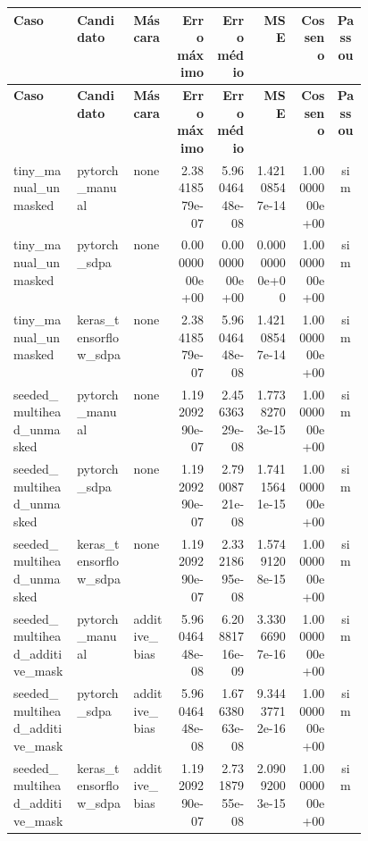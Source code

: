 \begin{landscape}
\scriptsize
\begin{longtable}{@{}p{0.18\linewidth}p{0.16\linewidth}p{0.12\linewidth}rrrrc@{}}
\toprule
\textbf{Caso} & \textbf{Candidato} & \textbf{Máscara} & \textbf{Erro máximo} & \textbf{Erro médio} & \textbf{MSE} & \textbf{Cosseno} & \textbf{Passou} \\
\midrule
\endfirsthead
\toprule
\textbf{Caso} & \textbf{Candidato} & \textbf{Máscara} & \textbf{Erro máximo} & \textbf{Erro médio} & \textbf{MSE} & \textbf{Cosseno} & \textbf{Passou} \\
\midrule
\endhead
tiny\_\allowbreak{}manual\_\allowbreak{}unmasked & pytorch\_\allowbreak{}manual & none & 2.38418579e-07 & 5.96046448e-08 & 1.42108547e-14 & 1.00000000e+00 & sim \\
tiny\_\allowbreak{}manual\_\allowbreak{}unmasked & pytorch\_\allowbreak{}sdpa & none & 0.00000000e+00 & 0.00000000e+00 & 0.00000000e+00 & 1.00000000e+00 & sim \\
tiny\_\allowbreak{}manual\_\allowbreak{}unmasked & keras\_\allowbreak{}tensorflow\_\allowbreak{}sdpa & none & 2.38418579e-07 & 5.96046448e-08 & 1.42108547e-14 & 1.00000000e+00 & sim \\
seeded\_\allowbreak{}multihead\_\allowbreak{}unmasked & pytorch\_\allowbreak{}manual & none & 1.19209290e-07 & 2.45636329e-08 & 1.77382703e-15 & 1.00000000e+00 & sim \\
seeded\_\allowbreak{}multihead\_\allowbreak{}unmasked & pytorch\_\allowbreak{}sdpa & none & 1.19209290e-07 & 2.79008721e-08 & 1.74115641e-15 & 1.00000000e+00 & sim \\
seeded\_\allowbreak{}multihead\_\allowbreak{}unmasked & keras\_\allowbreak{}tensorflow\_\allowbreak{}sdpa & none & 1.19209290e-07 & 2.33218695e-08 & 1.57491208e-15 & 1.00000000e+00 & sim \\
seeded\_\allowbreak{}multihead\_\allowbreak{}additive\_\allowbreak{}mask & pytorch\_\allowbreak{}manual & additive\_\allowbreak{}bias & 5.96046448e-08 & 6.20881716e-09 & 3.33066907e-16 & 1.00000000e+00 & sim \\
seeded\_\allowbreak{}multihead\_\allowbreak{}additive\_\allowbreak{}mask & pytorch\_\allowbreak{}sdpa & additive\_\allowbreak{}bias & 5.96046448e-08 & 1.67638063e-08 & 9.34437712e-16 & 1.00000000e+00 & sim \\
seeded\_\allowbreak{}multihead\_\allowbreak{}additive\_\allowbreak{}mask & keras\_\allowbreak{}tensorflow\_\allowbreak{}sdpa & additive\_\allowbreak{}bias & 1.19209290e-07 & 2.73187955e-08 & 2.09092003e-15 & 1.00000000e+00 & sim \\

\end{longtable}
\end{landscape}

